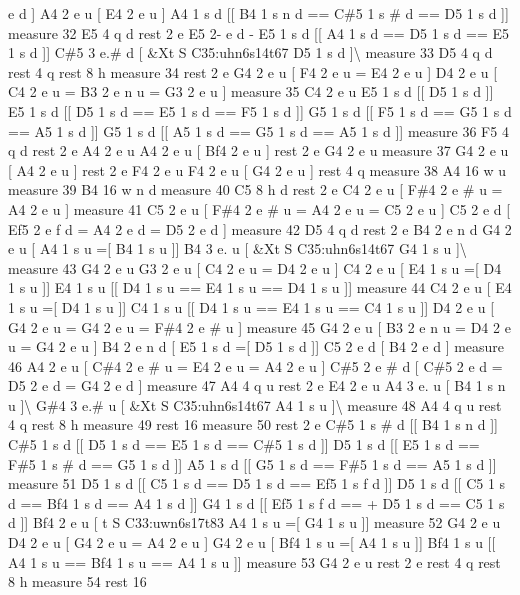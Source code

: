 e d \mbox{]} A4 2 e u \mbox{[} E4 2 e u \mbox{]} A4 1 s d \mbox{[}\mbox{[} B4 1 s n d == C\#5 1 s \# d == D5 1 s d \mbox{]}\mbox{]} measure 32 E5 4 q d rest 2 e E5 2-\/ e d -\/ E5 1 s d \mbox{[}\mbox{[} A4 1 s d == D5 1 s d == E5 1 s d \mbox{]}\mbox{]} C\#5 3 e.\# d \mbox{[} \&Xt S C35\+:uhn6s14t67 D5 1 s d \mbox{]}\textbackslash{} measure 33 D5 4 q d rest 4 q rest 8 h measure 34 rest 2 e G4 2 e u \mbox{[} F4 2 e u = E4 2 e u \mbox{]} D4 2 e u \mbox{[} C4 2 e u = B3 2 e n u = G3 2 e u \mbox{]} measure 35 C4 2 e u E5 1 s d \mbox{[}\mbox{[} D5 1 s d \mbox{]}\mbox{]} E5 1 s d \mbox{[}\mbox{[} D5 1 s d == E5 1 s d == F5 1 s d \mbox{]}\mbox{]} G5 1 s d \mbox{[}\mbox{[} F5 1 s d == G5 1 s d == A5 1 s d \mbox{]}\mbox{]} G5 1 s d \mbox{[}\mbox{[} A5 1 s d == G5 1 s d == A5 1 s d \mbox{]}\mbox{]} measure 36 F5 4 q d rest 2 e A4 2 e u A4 2 e u \mbox{[} Bf4 2 e u \mbox{]} rest 2 e G4 2 e u measure 37 G4 2 e u \mbox{[} A4 2 e u \mbox{]} rest 2 e F4 2 e u F4 2 e u \mbox{[} G4 2 e u \mbox{]} rest 4 q measure 38 A4 16 w u measure 39 B4 16 w n d measure 40 C5 8 h d rest 2 e C4 2 e u \mbox{[} F\#4 2 e \# u = A4 2 e u \mbox{]} measure 41 C5 2 e u \mbox{[} F\#4 2 e \# u = A4 2 e u = C5 2 e u \mbox{]} C5 2 e d \mbox{[} Ef5 2 e f d = A4 2 e d = D5 2 e d \mbox{]} measure 42 D5 4 q d rest 2 e B4 2 e n d G4 2 e u \mbox{[} A4 1 s u =\mbox{[} B4 1 s u \mbox{]}\mbox{]} B4 3 e. u \mbox{[} \&Xt S C35\+:uhn6s14t67 G4 1 s u \mbox{]}\textbackslash{} measure 43 G4 2 e u G3 2 e u \mbox{[} C4 2 e u = D4 2 e u \mbox{]} C4 2 e u \mbox{[} E4 1 s u =\mbox{[} D4 1 s u \mbox{]}\mbox{]} E4 1 s u \mbox{[}\mbox{[} D4 1 s u == E4 1 s u == D4 1 s u \mbox{]}\mbox{]} measure 44 C4 2 e u \mbox{[} E4 1 s u =\mbox{[} D4 1 s u \mbox{]}\mbox{]} C4 1 s u \mbox{[}\mbox{[} D4 1 s u == E4 1 s u == C4 1 s u \mbox{]}\mbox{]} D4 2 e u \mbox{[} G4 2 e u = G4 2 e u = F\#4 2 e \# u \mbox{]} measure 45 G4 2 e u \mbox{[} B3 2 e n u = D4 2 e u = G4 2 e u \mbox{]} B4 2 e n d \mbox{[} E5 1 s d =\mbox{[} D5 1 s d \mbox{]}\mbox{]} C5 2 e d \mbox{[} B4 2 e d \mbox{]} measure 46 A4 2 e u \mbox{[} C\#4 2 e \# u = E4 2 e u = A4 2 e u \mbox{]} C\#5 2 e \# d \mbox{[} C\#5 2 e d = D5 2 e d = G4 2 e d \mbox{]} measure 47 A4 4 q u rest 2 e E4 2 e u A4 3 e. u \mbox{[} B4 1 s n u \mbox{]}\textbackslash{} G\#4 3 e.\# u \mbox{[} \&Xt S C35\+:uhn6s14t67 A4 1 s u \mbox{]}\textbackslash{} measure 48 A4 4 q u rest 4 q rest 8 h measure 49 rest 16 measure 50 rest 2 e C\#5 1 s \# d \mbox{[}\mbox{[} B4 1 s n d \mbox{]}\mbox{]} C\#5 1 s d \mbox{[}\mbox{[} D5 1 s d == E5 1 s d == C\#5 1 s d \mbox{]}\mbox{]} D5 1 s d \mbox{[}\mbox{[} E5 1 s d == F\#5 1 s \# d == G5 1 s d \mbox{]}\mbox{]} A5 1 s d \mbox{[}\mbox{[} G5 1 s d == F\#5 1 s d == A5 1 s d \mbox{]}\mbox{]} measure 51 D5 1 s d \mbox{[}\mbox{[} C5 1 s d == D5 1 s d == Ef5 1 s f d \mbox{]}\mbox{]} D5 1 s d \mbox{[}\mbox{[} C5 1 s d == Bf4 1 s d == A4 1 s d \mbox{]}\mbox{]} G4 1 s d \mbox{[}\mbox{[} Ef5 1 s f d == + D5 1 s d == C5 1 s d \mbox{]}\mbox{]} Bf4 2 e u \mbox{[} t S C33\+:uwn6s17t83 A4 1 s u =\mbox{[} G4 1 s u \mbox{]}\mbox{]} measure 52 G4 2 e u D4 2 e u \mbox{[} G4 2 e u = A4 2 e u \mbox{]} G4 2 e u \mbox{[} Bf4 1 s u =\mbox{[} A4 1 s u \mbox{]}\mbox{]} Bf4 1 s u \mbox{[}\mbox{[} A4 1 s u == Bf4 1 s u == A4 1 s u \mbox{]}\mbox{]} measure 53 G4 2 e u rest 2 e rest 4 q rest 8 h measure 54 rest 16 